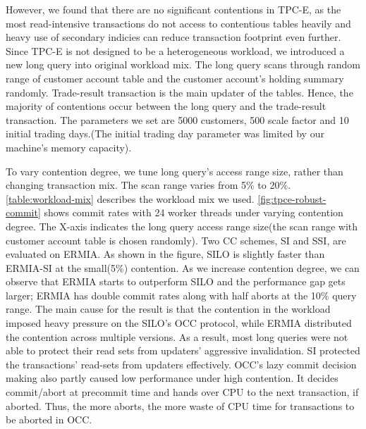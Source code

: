 However, we found that there are no significant contentions in TPC-E, as the most read-intensive transactions do not access to contentious tables heavily and heavy use of secondary indicies can reduce transaction footprint even further. Since TPC-E is not designed to be a heterogeneous workload, we introduced a new long query into original workload mix. The long query scans through random range of customer account table and the customer account's holding summary randomly. Trade-result transaction is the main updater of the tables. Hence, the majority of contentions occur between the long query and the trade-result transaction. 
The parameters we set are 5000 customers, 500 scale factor and 10 initial trading days.(The initial trading day parameter was limited by our machine's memory capacity). %

To vary contention degree, we tune long query's access range size, rather than changing transaction mix. The scan range varies from 5\% to 20\%. \ref{table:workload-mix} describes the workload mix we used. %
\ref{fig:tpce-robust-commit} shows commit rates with 24 worker threads under varying contention degree. The X-axis indicates the long query access range size(the scan range with customer account table is chosen randomly). Two CC schemes, SI and SSI, are evaluated on ERMIA. As shown in the figure, SILO is slightly faster than ERMIA-SI at the small(5\%) contention. As we increase contention degree, we can observe that ERMIA starts to outperform SILO and the performance gap gets larger; ERMIA has double commit rates along with half aborts at the 10\% query range. %
The main cause for the result is that the contention in the workload imposed heavy pressure on the SILO's OCC protocol, while ERMIA distributed the contention across multiple versions. As a result, most long queries were not able to protect their read sets from updaters' aggressive invalidation. SI protected the transactions' read-sets from updaters effectively. OCC's lazy commit decision making also partly caused low performance under high contention. It decides commit/abort at precommit time and hands over CPU to the next transaction, if aborted. Thus, the more aborts, the more waste of CPU time for transactions to be aborted in OCC.


